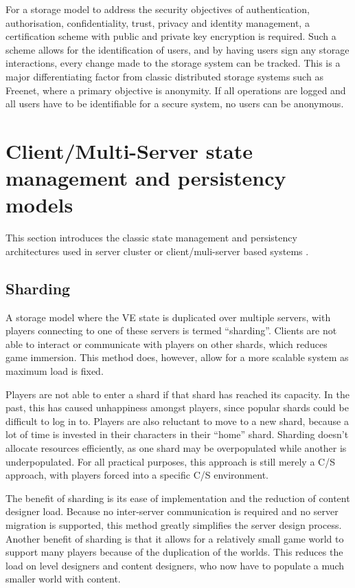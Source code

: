 For a storage model to address the security objectives of authentication, authorisation, confidentiality, trust, privacy and identity
management, a certification scheme with public and private key encryption is required. Such a scheme allows for the identification of users, and by
having users sign any storage interactions, every change made to the storage system can be tracked. This is a major differentiating factor from
classic distributed storage systems such as Freenet, where a primary objective is anonymity. If all operations are logged and all users have to be
identifiable for a secure system, no users can be anonymous.

\section{Client/Multi-Server state management and persistency models}
\label{cms_models}

This section introduces the classic state management and persistency architectures used in server cluster or client/muli-server based systems \cite{Hu_voronoi_IM}.

\subsection{Sharding}

A storage model where the VE state is duplicated over multiple servers, with players connecting to one of these servers is termed ``sharding''. Clients are not able to interact or communicate with players on other shards, which reduces game immersion. This method does, however, allow for a more scalable system as maximum load is fixed.

Players are not able to enter a shard if that shard has reached its capacity. In the past, this has caused unhappiness amongst players, since popular
shards could be difficult to log in to. Players are also reluctant to move to a new shard, because a lot of time is invested in their characters in
their ``home'' shard. Sharding doesn't allocate resources efficiently, as one shard may be overpopulated while another is underpopulated. For all
practical purposes, this approach is still merely a C/S approach, with players forced into a specific C/S environment.

The benefit of sharding is its ease of implementation and the reduction of content designer load. Because no inter-server communication is required
and no server migration is supported, this method greatly simplifies the server design process. Another benefit of sharding is that it allows for a
relatively small game world to support many players because of the duplication of the worlds. This reduces the load on level designers and content
designers, who now have to populate a much smaller world with content.

